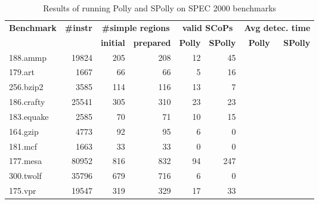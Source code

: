 \begin{table}[htbp]
  \caption{Results of running Polly and SPolly on SPEC 2000 benchmarks}
  \begin{tabular}{| l | r | r | r | r | r | r | r |}
    \hline
    \multirow{2}{*}{\textbf{Benchmark}} & \multirow{2}{*}{\textbf{\#instr}} & \multicolumn{2}{c|}{\textbf{\#simple regions}} &  \multicolumn{2}{c|}{\textbf{valid SCoPs}} &  \multicolumn{2}{c|}{\textbf{Avg detec. time}} \\
    \cline{3-8} 
    & & \textbf{initial} & \textbf{prepared} & \textbf{Polly} & \textbf{SPolly} & \textbf{Polly} & \textbf{SPolly} \\
    \hline
    \hline
    188.ammp   & 19824  & 205 & 208 & 12 & 45 & &  \\
    179.art    &  1667  & 66  &  66 &  5 & 16 & &  \\
    256.bzip2  &  3585  & 114 & 116 & 13 &  7 & &  \\
    186.crafty & 25541  & 305 & 310 & 23 & 23 & &  \\
    183.equake &  2585  &  70 &  71 & 10 & 15 & &  \\
    164.gzip   &  4773  &  92 &  95 &  6 &  0 & &  \\
    181.mcf    &  1663 &  33 &  33  &  0 &  0 & &  \\
    177.mesa   & 80952 & 816 & 832  & 94 &247 & &  \\
    300.twolf  & 35796 & 679 & 716  &  6 &  0 & &  \\
    175.vpr    & 19547 & 319 & 329  & 17 & 33 & &  \\
    \hline
  \end{tabular}
\end{table}

